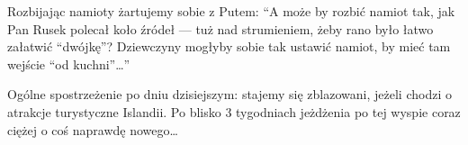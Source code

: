 Rozbijając namioty żartujemy sobie z Putem: “A może by rozbić namiot tak, jak Pan Rusek polecał koło źródeł --- tuż nad strumieniem, żeby rano było łatwo załatwić “dwójkę”? Dziewczyny mogłyby sobie tak ustawić namiot, by mieć tam wejście “od kuchni”…”


Ogólne spostrzeżenie po dniu dzisiejszym: stajemy się zblazowani, jeżeli chodzi o atrakcje turystyczne Islandii. Po blisko 3 tygodniach jeżdżenia po tej wyspie coraz ciężej o coś naprawdę nowego…
